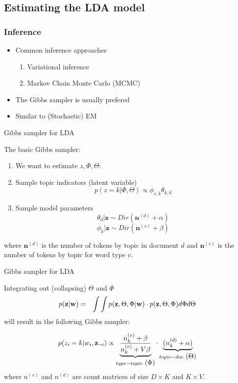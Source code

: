 \documentclass[10pt]{beamer}
\begin{document}
\subsection{Estimating the LDA model}

\begin{frame}
\frametitle{Inference}

\begin{itemize}
\item Common inference approaches

\begin{enumerate}
\item Variational inference %
\item Markov Chain Monte Carlo (MCMC) %
\end{enumerate}
\pause
\item The Gibbs sampler is usually prefered
\pause
\item Similar to (Stochastic) EM
\end{itemize}

\end{frame}



\begin{frame}{Gibbs sampler for LDA}

The basic Gibbs sampler:
\begin{enumerate}
\item We want to estimate $z, \Phi, \Theta$:
\pause
\item Sample topic indicators (latent variable)
\[
p(z=k|\Phi,\Theta)\propto\phi_{v,k}\theta_{k,d}
\]
\pause
\item Sample model parameters
\[
\theta_{d}|\mathbf{z}\sim Dir(\mathbf{n}^{(d)}+\alpha)
\]
\[
\phi_{k}|\mathbf{z}\sim Dir(\mathbf{n}^{(v)}+\beta)
\]
\end{enumerate}

where $\mathbf{n}^{(d)}$ is the number of tokens by topic in document
$d$ and $\mathbf{n}^{(v)}$ is the number of tokens by topic for word
type $v$.
\end{frame}

\begin{frame}{Gibbs sampler for LDA}

Integrating out (collapsing) $\Theta$ and $\Phi$ %
\begin{eqnarray*}
p(\mathbf{z}|\mathbf{w}) & = & \int\int p(\mathbf{z},\Theta,\Phi|\mathbf{w})\cdot p(\mathbf{z},\Theta,\Phi)d\mbox{\ensuremath{\Phi}}d\mbox{\ensuremath{\Theta}}
\end{eqnarray*}
will result in the following Gibbs sampler:

\[
p(z_{i}=k|w_{i},\mathbf{z}_{\lnot i})\propto\underbrace{\frac{n_{k}^{(v)}+\beta}{n_{k}^{(v)}+V\beta}}_{type-topic\mbox{ }\mbox{(\ensuremath{\Phi})}}\cdot\underbrace{(n_{k}^{(d)}+\alpha)}_{topic-doc\mbox{ }\mbox{(\ensuremath{\Theta})}}
\]
where $n^{(v)}$ and $n^{(d)}$ are count matrices of size $D\times K$
and $K\times V$.
\end{frame}
\end{document}
